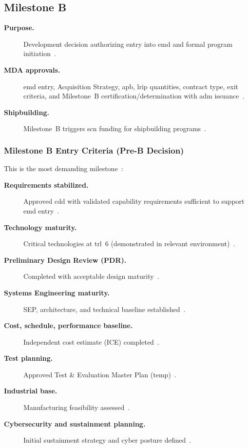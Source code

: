 \documentclass[../main.tex]{subfiles}
\begin{document}
\subsection{Milestone B}
\begin{description}
  \item[\textbf{Purpose.}] Development decision authorizing entry into \ac{emd} and formal program initiation~\autocite{DoDI5000-85,edo-3-3-2-acq-milestones-phases-2025}.
  \item[\textbf{MDA approvals.}] \ac{emd} entry, Acquisition Strategy, \ac{apb}, \ac{lrip} quantities, contract type, exit criteria, and Milestone~B certification/determination with \ac{adm} issuance~\autocite{DoDI5000-85,edo-3-3-2-acq-milestones-phases-2025}.
  \item[\textbf{Shipbuilding.}] Milestone~B triggers \ac{scn} funding for shipbuilding programs~\autocite{edo-3-3-2-acq-milestones-phases-2025}.
\end{description}

\subsubsection{Milestone B Entry Criteria (Pre-B Decision)}
This is the most demanding milestone~\autocite{DoDI5000-85,edo-3-3-2-acq-milestones-phases-2025}:
\begin{description}
  \item[\textbf{Requirements stabilized.}] Approved \ac{cdd} with validated capability requirements sufficient to support \ac{emd} entry~\autocite{DoDI5000-85,edo-3-3-2-acq-milestones-phases-2025}.
  \item[\textbf{Technology maturity.}] Critical technologies at \ac{trl}~6 (demonstrated in relevant environment)~\autocite{DoDI5000-85,USDRE-TRA-2025,edo-3-3-2-acq-milestones-phases-2025}.
  \item[\textbf{Preliminary Design Review (PDR).}] Completed with acceptable design maturity~\autocite{DoDI5000-85,DoD-EngineeringDefenseSystemsGuidebook-2024,edo-3-3-2-acq-milestones-phases-2025}.
  \item[\textbf{Systems Engineering maturity.}] SEP, architecture, and technical baseline established~\autocite{DoDI5000-85,DoDI5000-88,edo-3-3-2-acq-milestones-phases-2025}.
  \item[\textbf{Cost, schedule, performance baseline.}] Independent cost estimate (ICE) completed~\autocite{DoDI5000-85,DoDI5000-73-Cost-Analysis-2024,edo-3-3-2-acq-milestones-phases-2025}.
  \item[\textbf{Test planning.}] Approved Test \& Evaluation Master Plan (\ac{temp})~\autocite{DoDI5000-85,DoDI5000-89,edo-3-3-2-acq-milestones-phases-2025}.
  \item[\textbf{Industrial base.}] Manufacturing feasibility assessed~\autocite{DoDI5000-85,DoD-MRL-Deskbook-2025,edo-3-3-2-acq-milestones-phases-2025}.
  \item[\textbf{Cybersecurity and sustainment planning.}] Initial sustainment strategy and cyber posture defined~\autocite{DoDI5000-85,DoDI5000-90,DoDI5000-91,edo-3-3-2-acq-milestones-phases-2025}.
\end{description}
\end{document}
